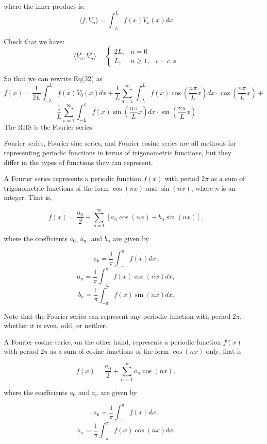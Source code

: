 \documentclass[12pt]{article} %
\begin{document}
 where the inner product is:
 $$
\langle f, V_{n}\rangle = \int_{-L}^{L} f(x)V_{n}(x)dx
 $$\par
 Check that we have:
 $$
 \langle V_{n}^{i}, V_{n}^{i}\rangle =
 \left\{
 \begin{array}{lll}
 2L, & n =0\\
 L, & n\ge1, & i = c,s
 \end{array}
 \right.
 $$\par 
 So that we can rewrite Eq(32) as
 \begin{equation}
 f(x) = \frac{1}{2L}\int_{-L}^{L} f(x)V_{0}(x)dx+\frac{1}{L}
 \sum_{n=1}^{\infty} \int_{-L}^{L} f(x) \cos  \left( \frac{n\pi}{L}x\right) dx \cdot \cos  \left( \frac{n\pi}{L}x\right)+
 \end{equation} 
 $$
  \frac{1}{L}\sum_{n=1}^{\infty} \int_{-L}^{L} f(x) \sin  \left( \frac{n\pi}{L}x\right) dx \cdot \sin  \left( \frac{n\pi}{L}x\right)
 $$
 The RHS is the Fourier series.\par
 Fourier series, Fourier sine series, and Fourier cosine series are all methods for representing periodic functions in terms of trigonometric functions, but they differ in the types of functions they can represent.

A Fourier series represents a periodic function $f(x)$ with period $2\pi$ as a sum of trigonometric functions of the form $\cos(nx)$ and $\sin(nx)$, where $n$ is an integer. That is,

$$f(x) = \frac{a_0}{2} + \sum_{n=1}^\infty \left[a_n \cos(nx) + b_n \sin(nx)\right],$$

where the coefficients $a_0$, $a_n$, and $b_n$ are given by

$$a_0 = \frac{1}{\pi} \int_{-\pi}^{\pi} f(x) dx,$$
$$a_n = \frac{1}{\pi} \int_{-\pi}^{\pi} f(x) \cos(nx) dx,$$
$$b_n = \frac{1}{\pi} \int_{-\pi}^{\pi} f(x) \sin(nx) dx.$$

Note that the Fourier series can represent any periodic function with period $2\pi$, whether it is even, odd, or neither.

A Fourier cosine series, on the other hand, represents a periodic function $f(x)$ with period $2\pi$ as a sum of cosine functions of the form $\cos(nx)$ only, that is

$$f(x) = \frac{a_0}{2} + \sum_{n=1}^\infty a_n \cos(nx),$$

where the coefficients $a_0$ and $a_n$ are given by

$$a_0 = \frac{1}{\pi} \int_{-\pi}^{\pi} f(x) dx,$$
$$a_n = \frac{1}{\pi} \int_{-\pi}^{\pi} f(x) \cos(nx) dx.$$
\end{document}
